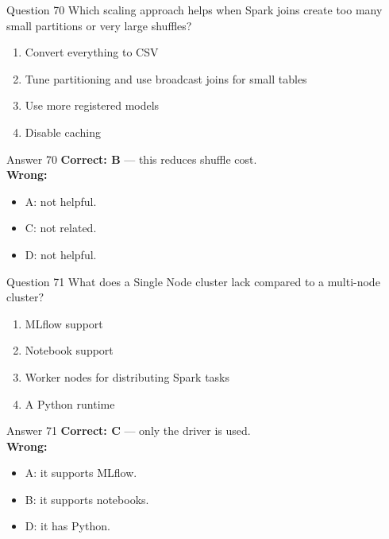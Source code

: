 \documentclass[aspectratio=169,11pt]{beamer}
\begin{document}
\begin{frame}{Question 70}
Which scaling approach helps when Spark joins create too many small partitions or very large shuffles?
\begin{enumerate}[label=\Alph*.]
\item Convert everything to CSV
\item Tune partitioning and use broadcast joins for small tables
\item Use more registered models
\item Disable caching
\end{enumerate}
\end{frame}
\begin{frame}{Answer 70}
\textbf{Correct: B} --- this reduces shuffle cost.\\
\vspace{0.5em}
\textbf{Wrong:}
\begin{itemize}
\item A: not helpful.
\item C: not related.
\item D: not helpful.
\end{itemize}
\end{frame}

\begin{frame}{Question 71}
What does a Single Node cluster lack compared to a multi-node cluster?
\begin{enumerate}[label=\Alph*.]
\item MLflow support
\item Notebook support
\item Worker nodes for distributing Spark tasks
\item A Python runtime
\end{enumerate}
\end{frame}
\begin{frame}{Answer 71}
\textbf{Correct: C} --- only the driver is used.\\
\vspace{0.5em}
\textbf{Wrong:}
\begin{itemize}
\item A: it supports MLflow.
\item B: it supports notebooks.
\item D: it has Python.
\end{itemize}
\end{frame}
\end{document}
